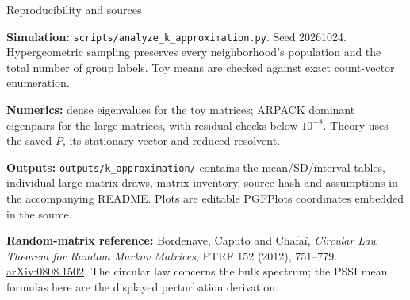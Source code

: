 \documentclass[aspectratio=169,10pt]{beamer}
\begin{document}
\begin{frame}{Reproducibility and sources}
\small

\textbf{Simulation:} \texttt{scripts/analyze\_k\_approximation.py}. Seed 20261024. Hypergeometric sampling preserves every neighborhood's population and the total number of group labels. Toy means are checked against exact count-vector enumeration.
\medskip

\textbf{Numerics:} dense eigenvalues for the toy matrices; ARPACK dominant eigenpairs for the large matrices, with residual checks below $10^{-8}$. Theory uses the saved $P$, its stationary vector and reduced resolvent.
\medskip

\textbf{Outputs:} \texttt{outputs/k\_approximation/} contains the mean/SD/interval tables, individual large-matrix draws, matrix inventory, source hash and assumptions in the accompanying README. Plots are editable PGFPlots coordinates embedded in the source.
\medskip

\textbf{Random-matrix reference:} Bordenave, Caputo and Chafa\"i, \emph{Circular Law Theorem for Random Markov Matrices}, PTRF 152 (2012), 751--779. \href{https://arxiv.org/abs/0808.1502}{arXiv:0808.1502}. The circular law concerns the bulk spectrum; the PSSI mean formulas here are the displayed perturbation derivation.

\end{frame}
\end{document}

